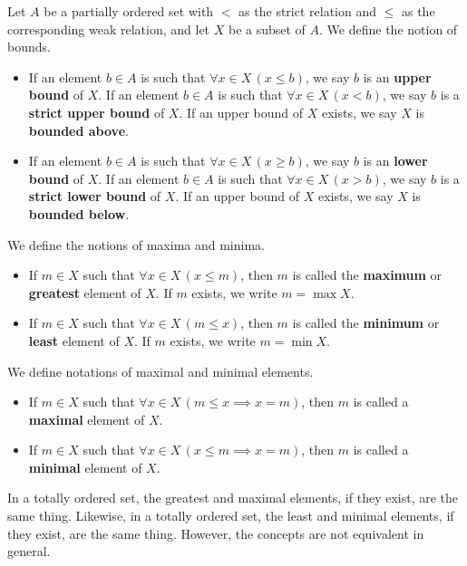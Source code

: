 \begin{definition}
	Let $A$ be a partially ordered set with $<$ as the strict relation and $\le$ as the corresponding weak relation, and let $X$ be a subset of $A$.
	We define the notion of bounds.
	\begin{itemize}[itemsep=-0.4ex]
		\item If an element $b\in A$ is such that $\forall x\in X\, (x\le b)$, we say $b$ is an \textbf{upper bound} of $X$. 
		If an element $b\in A$ is such that $\forall x\in X\, (x < b)$, we say $b$ is a \textbf{strict upper bound} of $X$.
		If an upper bound of $X$ exists, we say $X$ is \textbf{bounded above}. 
		\item If an element $b\in A$ is such that $\forall x\in X\, (x\ge b)$, we say $b$ is an \textbf{lower bound} of $X$. 
		If an element $b\in A$ is such that $\forall x\in X\, (x > b)$, we say $b$ is a \textbf{strict lower bound} of $X$.
		If an upper bound of $X$ exists, we say $X$ is \textbf{bounded below}. 
	\end{itemize}
	We define the notions of maxima and minima.
	\begin{itemize}[itemsep=-0.4ex]
		\item If $m\in X$ such that $\forall x\in X\, (x\le m)$, then $m$ is called the \textbf{maximum} or \textbf{greatest} element of $X$.
		If $m$ exists, we write $m = \max X$. 
		\item If $m\in X$ such that $\forall x\in X\, (m\le x)$, then $m$ is called the \textbf{minimum} or \textbf{least} element of $X$.
		If $m$ exists, we write $m = \min X$. 
	\end{itemize}
	We define notations of maximal and minimal elements. 
	\begin{itemize}[itemsep=-0.4ex]
		\item If $m\in X$ such that $\forall x\in X\, (m\le x\implies x = m)$, then $m$ is called a \textbf{maximal} element of $X$. 
		\item If $m\in X$ such that $\forall x\in X\, (x\le m\implies x = m)$, then $m$ is called a \textbf{minimal} element of $X$. 
	\end{itemize}
\end{definition}

In a totally ordered set, the greatest and maximal elements, if they exist, are the same thing.
Likewise, in a totally ordered set, the least and minimal elements, if they exist, are the same thing.
However, the concepts are not equivalent in general.

